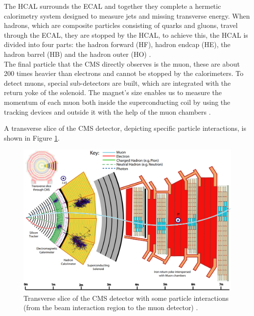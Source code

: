 The HCAL surrounds the ECAL and together they complete a hermetic calorimetry system designed to measure jets and missing transverse energy. When hadrons, which are composite particles consisting of quarks and gluons, travel through the ECAL, they are stopped by the HCAL, to achieve  this, the HCAL is divided into four parts: the hadron forward (HF),  hadron endcap (HE), the hadron barrel (HB) and the hadron outer (HO) \cite{det_summary}.\\

The final particle that the CMS directly observes is the muon, these are about 200 times heavier than electrons and cannot be stopped by the calorimeters. To detect muons, special sub-detectors are built, which are integrated with the return yoke of the solenoid. The magnet's size enables us to measure the momentum of each muon both inside the superconducting coil by using the tracking devices and outside it with the help of the muon chambers \cite{det_summary}.

A transverse slice of the CMS detector, depicting specific particle interactions, is shown in Figure \ref{slice_CMS}.

\begin{center}
  \begin{figure}[ht]
    \centering
    \includegraphics[scale=.3]{Chapter2/slice_det.png}
    \caption[Transverse slice view of the CMS detector]{Transverse slice of the CMS detector with some particle interactions (from the beam interaction region to the muon detector) \cite{det_summary}.}
    \label{slice_CMS}
  \end{figure}
\end{center}

